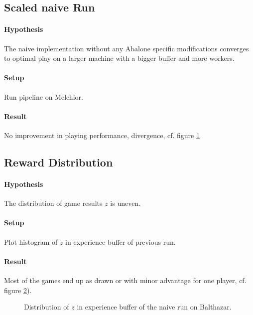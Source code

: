 \subsection{Scaled naive Run}
\paragraph{Hypothesis} The naive implementation without any Abalone specific modifications converges to optimal play on a larger machine with a bigger buffer and more workers.
\paragraph{Setup} Run pipeline on Melchior.
\paragraph{Result} No improvement in playing performance, divergence, cf. figure \ref{performance_remote_naive}
\begin{figure}[!h]
    \centering
    \hfill
    \caption{}
    \label{performance_remote_naive}
\end{figure}

\subsection{Reward Distribution}
\paragraph{Hypothesis} The distribution of game results $z$ is uneven.
\paragraph{Setup} Plot histogram of $z$ in experience buffer of previous run.
\paragraph{Result} Most of the games end up as drawn or with minor advantage for one player, cf. figure \ref{distribution_of_rewards}).

\begin{figure}[!h]
    \centering
    \hfill
    \caption{Distribution of $z$ in experience buffer of the naive run on Balthazar.}
    \label{distribution_of_rewards}
\end{figure}

